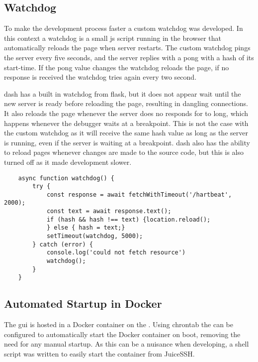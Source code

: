 \subsection{Watchdog}
To make the development process faster a custom watchdog was developed.
In this context a watchdog is a small \gls{js} script running in the browser that automatically reloads the page when server restarts.
The custom watchdog pings the server every five seconds, and the server replies with a pong with a hash of its start-time.
If the pong value changes the watchdog reloads the page, if no response is received the watchdog tries again every two second.

\gls{dash} has a built in watchdog from \gls{flask}, but it does not appear wait until the new server is ready before reloading the page, resulting in dangling connections.
It also reloads the page whenever the server does no responds for to long, which happens whenever the debugger waits at a breakpoint.
This is not the case with the custom watchdog as it will receive the same hash value as long as the server is running, even if the server is waiting at a breakpoint.
\gls{dash} also has the ability to reload pages whenever changes are made to the source code, but this is also turned off as it made development slower.


\begin{listing}[H]
    \begin{verbatim}
    async function watchdog() {
        try {
            const response = await fetchWithTimeout('/hartbeat', 2000);
            const text = await response.text();
            if (hash && hash !== text) {location.reload();
            } else { hash = text;}
            setTimeout(watchdog, 5000);
        } catch (error) {
            console.log('could not fetch resource')
            watchdog();
        }
    }
    \end{verbatim}
\end{listing}

\subsection{Automated Startup in Docker}
The \gls{gui} is hosted in a Docker container on the \sr.
Using \gls{chrontab} the \sr can be configured to automatically start the Docker container on boot, removing the need for any manual startup.
As this can be a nuisance when developing, a shell script was written to easily start the container from JuiceSSH.